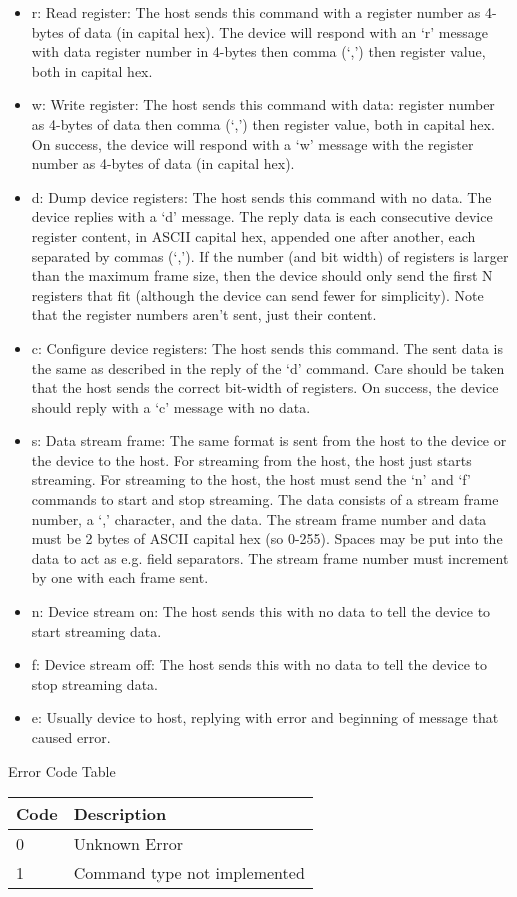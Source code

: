 \documentclass{customdocclass}
\begin{document}
\begin{itemize}
  \item r: Read register: The host sends this command with a register number as 4-bytes of data (in capital hex). The device will respond with an `r' message with data register number in 4-bytes then comma (`,') then register value, both in capital hex.
  \item w: Write register: The host sends this command with data: register number as 4-bytes of data then comma (`,') then register value, both in capital hex. On success, the device will respond with a `w' message with the register number as 4-bytes of data (in capital hex).
  \item d: Dump device registers: The host sends this command with no data. The device replies with a `d' message. The reply data is each consecutive device register content, in ASCII capital hex, appended one after another, each separated by commas (`,'). If the number (and bit width) of registers is larger than the maximum frame size, then the device should only send the first N registers that fit (although the device can send fewer for simplicity). Note that the register numbers aren't sent, just their content.
  \item c: Configure device registers: The host sends this command. The sent data is the same as described in the reply of the `d' command. Care should be taken that the host sends the correct bit-width of registers. On success, the device should reply with a `c' message with no data.
  \item s: Data stream frame: The same format is sent from the host to the device or the device to the host. For streaming from the host, the host just starts streaming. For streaming to the host, the host must send the `n' and `f' commands to start and stop streaming. The data consists of a stream frame number, a `,' character, and the data. The stream frame number and data must be 2 bytes of ASCII capital hex (so 0-255). Spaces may be put into the data to act as e.g. field separators. The stream frame number must increment by one with each frame sent.
  \item n: Device stream on: The host sends this with no data to tell the device to start streaming data.
  \item f: Device stream off: The host sends this with no data to tell the device to stop streaming data.
  \item e: Usually device to host, replying with error and beginning of message that caused error.
\end{itemize}

\begin{center}
\small
Error Code Table
\begin{tabularx}{\textwidth}{|l|X|} \hline
Code & Description \\ \hline
0 & Unknown Error \\ \hline
1 & Command type not implemented \\ \hline
\end{tabularx}
\end{center}
\end{document}
